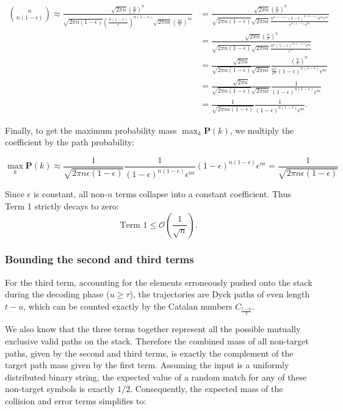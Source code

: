 \documentclass{article}
\newcommand{\eps}{\epsilon}
\begin{document}
{\begin{minipage}{\textwidth}
\begin{align*}
\binom{n}{n(1-\epsilon)} \approx \frac{\sqrt{2\pi n} \left(\frac{n}{e}\right)^n}{\sqrt{2\pi n(1-\eps)} \left(\frac{n(1-\eps)}{e}\right)^{n(1-\eps)}\sqrt{2\pi n\eps} \left(\frac{n\eps}{e}\right)^{n\eps}} &= \frac{\sqrt{2\pi n} \left(\frac{n}{e}\right)^n}{\sqrt{2\pi n(1-\eps)}\sqrt{2\pi n\eps}  \frac{n^{n(1-\eps)}(1-\eps)^{n(1-\eps)}n^{n\eps}\eps^{n\eps}}{e^{n(1-\eps)}e^{n\eps}} } \\
&= \frac{\sqrt{2\pi n} \left(\frac{n}{e}\right)^n}{\sqrt{2\pi n(1-\eps)}\sqrt{2\pi n\eps}  \frac{n^{n}(1-\eps)^{n(1-\eps)}\eps^{n\eps}}{e^{n}}} \\
&= \frac{\sqrt{2\pi n} }{\sqrt{2\pi n(1-\eps)}\sqrt{2\pi n\eps}} \frac{\left(\frac{n}{e}\right)^n}{\frac{n^{n}}{e^{n}}(1-\eps)^{n(1-\eps)}\eps^{n\eps}} \\
&= \frac{\sqrt{2\pi n} }{\sqrt{2\pi n(1-\eps)}\sqrt{2\pi n\eps}} \frac{1}{(1-\eps)^{n(1-\eps)}\eps^{n\eps}} \\
&= \frac{1}{\sqrt{2\pi n \eps(1-\eps)}} \frac{1}{(1-\eps)^{n(1-\eps)}\eps^{n\eps}}.
\end{align*}

Finally, to get the maximum probability mass $\max_k \mathbf{P}(k)$, we multiply the coefficient by the path probability:

$$
\max_k \mathbf{P}(k) \approx \frac{1}{\sqrt{2\pi n \eps(1-\eps)}} \frac{1}{(1-\eps)^{n(1-\eps)}\eps^{n\eps}} (1-\eps)^{n(1-\eps)}\eps^{n\eps} = \frac{1}{\sqrt{2\pi n \eps(1-\eps)}}
$$

Since $\eps$ is constant, all non-$n$ terms collapse into a constant coefficient. Thus Term 1 strictly decays to zero:
$$
\text{Term 1} \leq \mathcal{O}\left(\frac{1}{\sqrt{n}}\right).
$$
\end{minipage}}
\subsubsection*{Bounding the second and third terms}

For the third term, accounting for the elements erroneously pushed onto the stack during the decoding phase ($u \geq \tau$), the trajectories are Dyck paths of even length $t-u$, which can be counted exactly by the Catalan numbers $C_{\frac{t-u}{2}}$.

We also know that the three terms together represent all the possible mutually exclusive valid paths on the stack. Therefore the combined mass of all non-target paths, given by the second and third terms, is exactly the complement of the target path mass given by the first term. Assuming the input is a uniformly distributed binary string, the expected value of a random match for any of these non-target symbols is exactly $1/2$. Consequently, the expected mass of the collision and error terms simplifies to:
\end{document}
